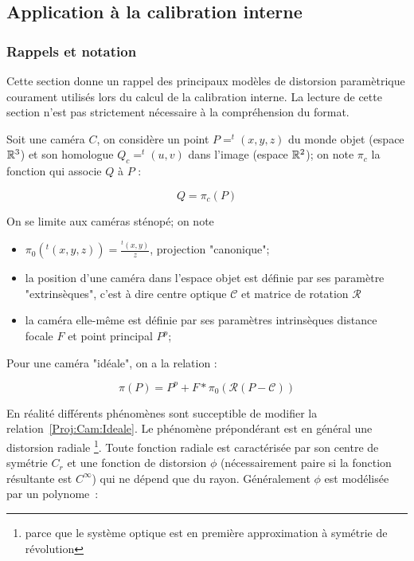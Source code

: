 
\subsection{Application \`a la calibration interne}

\subsubsection{Rappels et notation}

Cette section donne un rappel des principaux mod\`eles de distorsion
param\`etrique courament utilis\'es lors du calcul de la calibration
interne. La lecture de cette section n'est pas strictement n\'ecessaire
\`a la compr\'ehension du format.


Soit une cam\'era $C$,
on consid\`ere un point $P=^t(x,y,z)$ du  monde objet (espace $\RR^3$) et son
homologue $Q_c=^t(u,v)$ dans l'image (espace $\RR^2$);
on note $\pi_c$  la fonction qui associe $Q$ \`a $P$ :

\begin{equation}
   Q=\pi_c(P)
\end{equation}

On se limite aux cam\'eras st\'enop\'e; on note 

\begin{itemize}
   \item $\pi_0(^t(x,y,z))=\frac{^t(x,y)}{z}$, projection "canonique";
   \item  la position d'une cam\'era dans l'espace objet est d\'efinie
             par ses param\`etre "extrins\`eques", c'est \`a dire
             centre optique $\mathcal{C}$ et   matrice de 
             rotation $\mathcal{R}$ 
   \item     la cam\'era elle-m\^eme est d\'efinie par ses param\`etres
              intrins\`eques    distance focale $F$ et  point principal $P^p$; 
\end{itemize}

Pour une cam\'era "id\'eale", on a la relation  :

\begin{equation}
   \pi(P) =   P^p+F*\pi_0(\mathcal{R}(P-\mathcal{C}))
   \label{Proj:Cam:Ideale}
\end{equation}


En r\'ealit\'e diff\'erents ph\'enom\`enes sont
succeptible de modifier la relation~\ref{Proj:Cam:Ideale}. Le 
ph\'enom\`ene pr\'epond\'erant est en g\'en\'eral une distorsion
radiale \footnote{parce que le syst\`eme optique est en premi\`ere
approximation \`a sym\'etrie
de r\'evolution}. Toute fonction radiale est caract\'eris\'ee par
son centre de sym\'etrie $C_r$ et une fonction de distorsion
$\phi$ (n\'ecessairement paire si la fonction r\'esultante est 
$C^\infty$) qui ne d\'epend que du rayon.
G\'en\'eralement  $\phi$ est mod\'elis\'ee par un polynome~:

